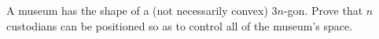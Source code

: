 A museum has the shape of a (not necessarily convex) 3$n$-gon.
Prove that $n$ custodians can be positioned so as to control all of the museum’s space.